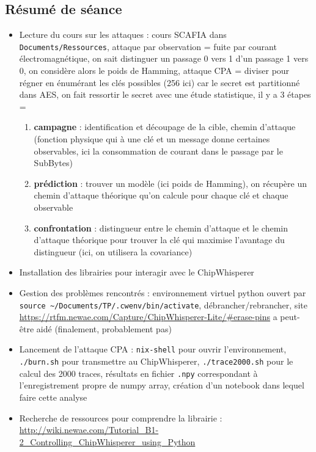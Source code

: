 \documentclass[12pt]{article}
\begin{document}
	\subsection{Résumé de séance}
	\begin{itemize}
		\item Lecture du cours sur les attaques : cours SCAFIA dans \verb|Documents/Ressources|, attaque par observation = fuite par courant électromagnétique, on sait distinguer un passage 0 vers 1 d'un passage 1 vers 0, on considère alors le poids de Hamming, attaque CPA = diviser pour régner en énumérant les clés possibles (256 ici) car le secret est partitionné dans AES, on fait ressortir le secret avec une étude statistique, il y a 3 étapes = 
		\begin{enumerate}
			\item \textbf{campagne} : identification et découpage de la cible, chemin d'attaque (fonction physique qui à une clé et un message donne certaines observables, ici la consommation de courant dans le passage par le SubBytes)
			\item \textbf{prédiction} : trouver un modèle (ici poids de Hamming), on récupère un chemin d'attaque théorique qu'on calcule pour chaque clé et chaque observable
			\item \textbf{confrontation} : distingueur entre le chemin d'attaque et le chemin d'attaque théorique pour trouver la clé qui maximise l'avantage du distingueur (ici, on utilisera la covariance)
		\end{enumerate} 
		\item Installation des librairies pour interagir avec le ChipWhisperer
		\item Gestion des problèmes rencontrés : environnement virtuel python ouvert par \\ \verb|source ~/Documents/TP/.cwenv/bin/activate|, débrancher/rebrancher, site \url{https://rtfm.newae.com/Capture/ChipWhisperer-Lite/#erase-pins} a peut-être aidé (finalement, probablement pas)
		\item Lancement de l'attaque CPA : \verb|nix-shell| pour ouvrir l'environnement, \verb|./burn.sh| pour transmettre au ChipWhisperer, \verb|./trace2000.sh| pour le calcul des 2000 traces, résultats en fichier \verb|.npy| correspondant à l'enregistrement propre de numpy array, création d'un notebook dans lequel faire cette analyse
		\item Recherche de ressources pour comprendre la librairie : \url{http://wiki.newae.com/Tutorial_B1-2_Controlling_ChipWhisperer_using_Python}	
	\end{itemize}
	
\end{document}
